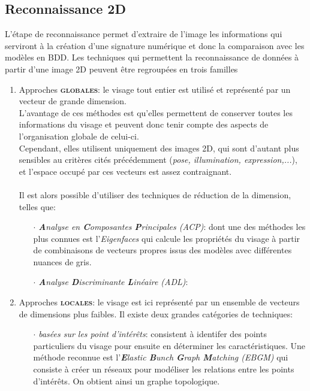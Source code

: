\subsection{Reconnaissance 2D}
L'étape de reconnaissance permet d'extraire de l'image les informations qui serviront à la création d'une signature numérique et donc la comparaison avec les modèles en BDD.
Les techniques qui permettent la reconnaissance de données à partir d'une image 2D peuvent être regroupées en trois familles \cite{Xphdthesis_1}
\begin{enumerate}\setlength{\itemsep}{.3em}
\item Approches \textsc{\textbf{globales}}: le visage tout entier est utilisé et représenté par un vecteur de grande dimension.
\\L'avantage de ces méthodes est qu'elles permettent de conserver toutes les informations du visage et peuvent donc tenir compte des aspects de l'organisation globale de celui-ci. 
\\Cependant, elles utilisent uniquement des images 2D, qui sont d'autant plus sensibles au critères cités précédemment (\textit{pose, illumination, expression,...}), et l'espace occupé par ces vecteurs est assez contraignant. \paragraph{}Il est alors possible d'utiliser des techniques de réduction de la dimension, telles que:
	\begin{itemize}\setlength{\itemsep}{.2em}
	\item[$\cdot$]\textit{\textbf{A}nalyse en \textbf{C}omposantes \textbf{P}rincipales (ACP)}: dont une des méthodes les plus connues est l'\textit{Eigenfaces} qui calcule les propriétés du visage à partir de combinaisons de vecteurs propres issus des modèles avec différentes nuances de gris.
	\item[$\cdot$]\textit{\textbf{A}nalyse \textbf{D}iscriminante \textbf{L}inéaire (ADL)}:
	\end{itemize}
\item Approches \textsc{\textbf{locales}}: le visage est ici représenté par un ensemble de vecteurs de dimensions plus faibles. Il existe deux grandes catégories de techniques:
	\begin{itemize}
	\item[$\cdot$] \textit{basées sur les point d'intérêts}: consistent à identifer des points particuliers du visage pour ensuite en déterminer les caractéristiques. Une méthode reconnue est l'\textit{\textbf{E}lastic \textbf{B}unch \textbf{G}raph \textbf{M}atching (EBGM)} qui consiste à créer un réseaux pour modéliser les relations entre les points d'intérêts. On obtient ainsi un graphe topologique.

\end{itemize}
\end{enumerate}
